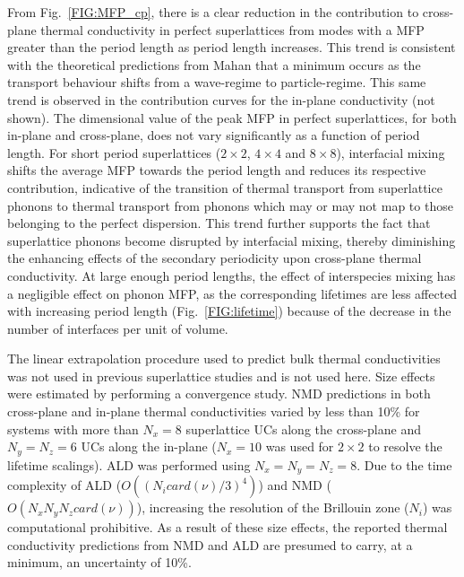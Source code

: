 From Fig.~\ref{FIG:MFP_cp}, there is a clear reduction in the contribution to cross-plane thermal conductivity in perfect superlattices from modes with a MFP greater than the period length as period length increases. This trend is consistent with the theoretical predictions from Mahan that a minimum occurs as the transport behaviour shifts from a wave-regime to particle-regime.\cite{PhysRevLett.84.927,PhysRevB.56.10754} This same trend is observed in the contribution curves for the in-plane conductivity (not shown). The dimensional value of the peak MFP in perfect superlattices, for both in-plane and cross-plane, does not vary significantly as a function of period length. For short period superlattices ($2\times2$, $4\times4$ and $8\times8$), interfacial mixing shifts the average MFP towards the period length and reduces its respective contribution, indicative of the transition of thermal transport from superlattice phonons to thermal transport from phonons which may or may not map to those belonging to the perfect dispersion. This trend further supports the fact that superlattice phonons become disrupted by interfacial mixing, thereby diminishing the enhancing effects of the secondary periodicity upon cross-plane thermal conductivity. At large enough period lengths, the effect of interspecies mixing has a negligible effect on phonon MFP, as the corresponding lifetimes are less affected with increasing period length (Fig.~\ref{FIG:lifetime}) because of the decrease in the number of interfaces per unit of volume. \cite{PhysRevB.79.075316}

The linear extrapolation procedure used to predict bulk thermal conductivities \cite{PhysRevB.81.214305} was not used in previous superlattice studies \cite{doi:10.1021/nl202186y,Luckyanova16112012} and is not used here. Size effects were estimated by performing a convergence study. NMD predictions in both cross-plane and in-plane thermal conductivities varied by less than 10\% for systems with more than $N_x=8$ superlattice UCs along the cross-plane and $N_y=N_z=6$ UCs along the in-plane ($N_x=10$ was used for $2\times2$ to resolve the lifetime scalings). ALD was performed using $N_x=N_y=N_z=8$. Due to the time complexity of ALD ($O((N_i card(\nu)/3)^4)$) and NMD ($O(N_x  N_y N_z card(\nu))$), increasing the resolution of the Brillouin zone ($N_i$) was computational prohibitive. As a result of these size effects, the reported thermal conductivity predictions from NMD and ALD are presumed to carry, at a minimum, an uncertainty of 10\%.


